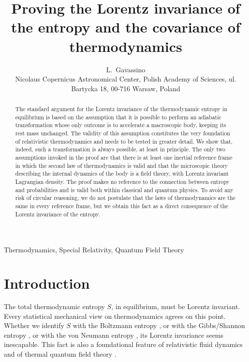 \documentclass[twocolumn,usenatbib]{mnras2}
\title[Invariance of the entropy]{Proving the Lorentz invariance of the entropy and the covariance of thermodynamics}
\author[L.~Gavassino]{L.~Gavassino\\
Nicolaus Copernicus Astronomical Center, Polish Academy of Sciences, ul. Bartycka 18, 00-716 Warsaw, Poland}
\begin{document}
\maketitle

\begin{abstract}
The  standard  argument  for  the  Lorentz  invariance  of  the  thermodynamic  entropy in equilibrium is based on the assumption that it is possible to perform an adiabatic transformation whose only outcome is to accelerate a macroscopic body, keeping its rest mass unchanged. The validity of this assumption constitutes the very foundation of relativistic thermodynamics and needs to be tested in greater detail. We show that, indeed, such a transformation is always possible, at least in principle. The only two assumptions invoked in the proof are that there is at least one inertial reference  frame  in  which  the  second  law of thermodynamics is  valid  and  that  the  microscopic theory describing the internal dynamics of the body is a field theory, with Lorentz invariant Lagrangian density. The proof makes no  reference  to  the  connection  between  entropy  and  probabilities  and  is  valid  both within classical and quantum physics. To avoid any risk of circular reasoning, we do not postulate that the laws of thermodynamics are the same in every reference frame, but we obtain this fact as a direct consequence of the Lorentz invariance of the entropy.
\end{abstract} 


\begin{keywords}
Thermodynamics, Special Relativity, Quantum Field Theory
\end{keywords}


\section{Introduction} 

The total thermodynamic entropy $S$, in equilibrium, must be Lorentz invariant. Every statistical mechanical view on thermodynamics agrees on this point. Whether we identify $S$ with the Boltzmann entropy \citep{degroot_book,cercignani_book}, or with the Gibbs/Shannon entropy \citep{Jaynes1965,Adami2011}, or with the von Neumann entropy \citep{Israel_1981_review,hakim_book}, its Lorentz invariance seems inescapable. This fact is also a foundational feature of relativistic fluid dynamics \citep{Israel_Stewart_1979,rezzolla_book} and of thermal quantum field theory \citep{Becattini2016}. 
\end{document}
